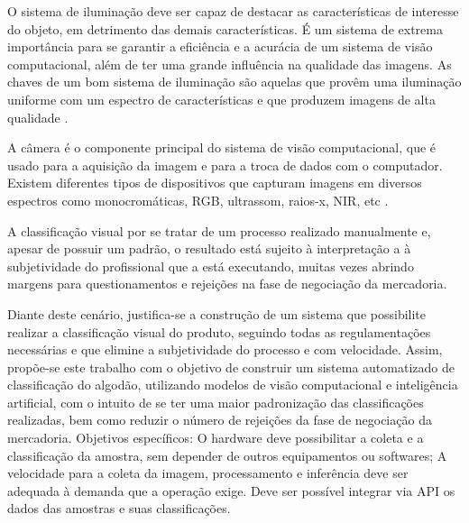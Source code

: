 O sistema de iluminação deve ser capaz de destacar as características de interesse do objeto, em
detrimento das demais características. É um sistema de extrema importância para se garantir a eficiência e
a acurácia de um sistema de visão computacional, além de ter uma grande influência na qualidade das
imagens. As chaves de um bom sistema de iluminação são aquelas que provêm uma iluminação uniforme
com um espectro de características e que produzem imagens de alta qualidade \cite{thomasson2005}.

A câmera é o componente principal do sistema de visão computacional, que é usado para a aquisição da
imagem e para a troca de dados com o computador. Existem diferentes tipos de dispositivos que capturam
imagens em diversos espectros como monocromáticas, RGB, ultrassom, raios-x, NIR, etc \cite{brosnan2002}.

A classificação visual por se tratar de um processo realizado manualmente e, apesar de possuir um
padrão, o resultado está sujeito à interpretação a à subjetividade do profissional que a está executando,
muitas vezes abrindo margens para questionamentos e rejeições na fase de negociação da mercadoria.

Diante deste cenário, justifica-se a construção de um sistema que possibilite realizar a classificação visual
do produto, seguindo todas as regulamentações necessárias e que elimine a subjetividade do processo e
com velocidade. Assim, propõe-se este trabalho com o objetivo de construir um sistema automatizado de
classificação do algodão, utilizando modelos de visão computacional e inteligência artificial, com o
intuito de se ter uma maior padronização das classificações realizadas, bem como reduzir o número de
rejeições da fase de negociação da mercadoria. Objetivos específicos: O hardware deve possibilitar a
coleta e a classificação da amostra, sem depender de outros equipamentos ou softwares; A velocidade
para a coleta da imagem, processamento e inferência deve ser adequada à demanda que a operação exige.
Deve ser possível integrar via API os dados das amostras e suas classificações.
